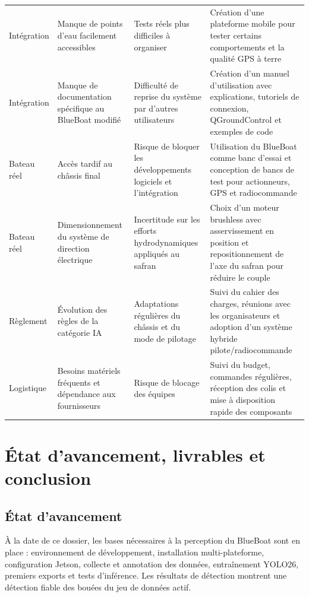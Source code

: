 \documentclass[11pt,letterpaper]{article}
\begin{document}
\begin{longtable}{L{2.5cm}L{3.8cm}L{3.8cm}L{4cm}}
    Intégration & Manque de points d'eau facilement accessibles & Tests réels plus difficiles à organiser & Création d'une plateforme mobile pour tester certains comportements et la qualité GPS à terre \\
    Intégration & Manque de documentation spécifique au BlueBoat modifié & Difficulté de reprise du système par d'autres utilisateurs & Création d'un manuel d'utilisation avec explications, tutoriels de connexion, QGroundControl et exemples de code \\
    Bateau réel & Accès tardif au châssis final & Risque de bloquer les développements logiciels et l'intégration & Utilisation du BlueBoat comme banc d'essai et conception de bancs de test pour actionneurs, GPS et radiocommande \\
    Bateau réel & Dimensionnement du système de direction électrique & Incertitude sur les efforts hydrodynamiques appliqués au safran & Choix d'un moteur brushless avec asservissement en position et repositionnement de l'axe du safran pour réduire le couple \\
    Règlement & Évolution des règles de la catégorie IA & Adaptations régulières du châssis et du mode de pilotage & Suivi du cahier des charges, réunions avec les organisateurs et adoption d'un système hybride pilote/radiocommande \\
    Logistique & Besoins matériels fréquents et dépendance aux fournisseurs & Risque de blocage des équipes & Suivi du budget, commandes régulières, réception des colis et mise à disposition rapide des composants \\
    \bottomrule
\end{longtable}

\section{État d'avancement, livrables et conclusion}

\subsection{État d'avancement}

À la date de ce dossier, les bases nécessaires à la perception du BlueBoat sont en place : environnement de développement, installation multi-plateforme, configuration Jetson, collecte et annotation des données, entraînement YOLO26, premiers exports et tests d'inférence. Les résultats de détection montrent une détection fiable des bouées du jeu de données actif.
\end{document}
